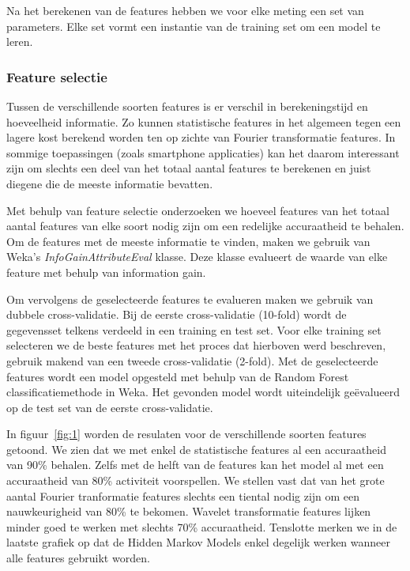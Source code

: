 \documentclass{article}
\begin{document}

Na het berekenen van de features hebben we voor elke meting een set van parameters. Elke set vormt een instantie van de training set om een model te leren.

\subsubsection{Feature selectie}
Tussen de verschillende soorten features is er verschil in berekeningstijd en hoeveelheid informatie. Zo kunnen statistische features in het algemeen tegen een lagere kost berekend worden ten op zichte van Fourier transformatie features. In sommige toepassingen (zoals smartphone applicaties) kan het daarom interessant zijn om slechts een deel van het totaal aantal features te berekenen en juist diegene die de meeste informatie bevatten.

Met behulp van feature selectie onderzoeken we hoeveel features van het totaal aantal features van elke soort nodig zijn om een redelijke accuraatheid te behalen. Om de features met de meeste informatie te vinden, maken we gebruik van Weka's \emph{InfoGainAttributeEval} klasse. %
 Deze klasse evalueert de waarde van elke feature met behulp van information gain.

Om vervolgens de geselecteerde features te evalueren maken we gebruik van dubbele cross-validatie. Bij de eerste cross-validatie (10-fold) wordt de gegevensset telkens verdeeld in een training en test set. Voor elke training set selecteren we de beste features met het proces dat hierboven werd beschreven, gebruik makend van een tweede cross-validatie (2-fold). Met de geselecteerde features wordt een model opgesteld met behulp van de Random Forest classificatiemethode in Weka. Het gevonden model wordt uiteindelijk ge\"evalueerd op de test set van de eerste cross-validatie.
	
In figuur~\ref{fig:1} worden de resulaten voor de verschillende soorten features getoond. We zien dat we met enkel de statistische features al een accuraatheid van 90\% behalen. Zelfs met de helft van de features kan het model al met een accuraatheid van 80\% activiteit voorspellen. We stellen vast dat van het grote aantal Fourier tranformatie features slechts een tiental nodig zijn om een nauwkeurigheid van 80\% te bekomen. Wavelet transformatie features lijken minder goed te werken met slechts 70\% accuraatheid. Tenslotte merken we in de laatste grafiek op dat de Hidden Markov Models enkel degelijk werken wanneer alle features gebruikt worden.
\end{document}
